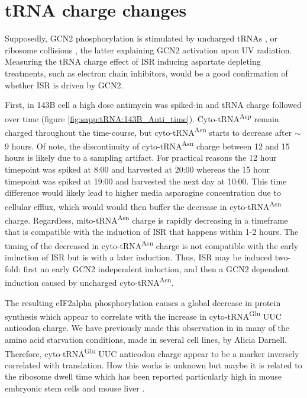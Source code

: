 \FloatBarrier
\section{tRNA charge changes}
Supposedly, GCN2 phosphorylation is stimulated by uncharged tRNAs \cite{Wek1989-yw, Dong2000-si}, or ribosome collisions \cite{Harding2019-kb, Wu2020-lq, Yan2021-yv}, the latter explaining GCN2 activation upon UV radiation.
Measuring the tRNA charge effect of ISR inducing aspartate depleting treatments, such as electron chain inhibitors, would be a good confirmation of whether ISR is driven by GCN2.

First, in 143B cell a high dose antimycin was spiked-in and tRNA charge followed over time (figure \ref{fig:sapp:tRNA:143B_Anti_time}).
Cyto-tRNA\textsuperscript{Asp} remain charged throughout the time-course, but cyto-tRNA\textsuperscript{Asn} starts to decrease after $\sim$9 hours.
Of note, the discontinuity of cyto-tRNA\textsuperscript{Asn} charge between 12 and 15 hours is likely due to a sampling artifact.
For practical reasons the 12 hour timepoint was spiked at 8:00 and harvested at 20:00 whereas the 15 hour timepoint was spiked at 19:00 and harvested the next day at 10:00.
This time difference would likely lead to higher media asparagine concentration due to cellular efflux, which would would then buffer the decrease in cyto-tRNA\textsuperscript{Asn} charge.
Regardless, mito-tRNA\textsuperscript{Asn} charge is rapidly decreasing in a timeframe that is compatible with the induction of ISR that happens within 1-2 hours.
The timing of the decreased in cyto-tRNA\textsuperscript{Asn} charge is not compatible with the early induction of ISR but is with a later induction.
Thus, ISR may be induced two-fold: first an early GCN2 independent induction, and then a GCN2 dependent induction caused by uncharged cyto-tRNA\textsuperscript{Asn}.

The resulting eIF2alpha phosphorylation causes a global decrease in protein synthesis which appear to correlate with the increase in cyto-tRNA\textsuperscript{Glu} UUC anticodon charge.
We have previously made this observation in in many of the amino acid starvation conditions, made in several cell lines, by Alicia Darnell.
Therefore, cyto-tRNA\textsuperscript{Glu} UUC anticodon charge appear to be a marker inversely correlated with translation.
How this works is unknown but maybe it is related to the ribosome dwell time which has been reported particularly high in mouse embryonic stem cells and mouse liver \cite{Ingolia2011-kj, Gobet2020-sl}.

